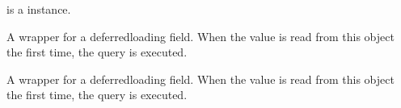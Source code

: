 \documentclass[letterpaper,10pt,spanish]{sphinxmanual}
\begin{document}
\begin{fulllineitems}
\begin{fulllineitems}
\sphinxAtStartPar
{} is a  instance.

\end{fulllineitems}



\begin{fulllineitems}

\pysigstartsignatures
{}
\pysigstopsignatures
\end{fulllineitems}



\begin{fulllineitems}

\pysigstartsignatures
{}
\pysigstopsignatures
\sphinxAtStartPar
A wrapper for a deferred\sphinxhyphen{}loading field. When the value is read from this
object the first time, the query is executed.

\end{fulllineitems}



\begin{fulllineitems}

\pysigstartsignatures
{}
\pysigstopsignatures
\end{fulllineitems}



\begin{fulllineitems}

\pysigstartsignatures
{}
\pysigstopsignatures
\end{fulllineitems}



\begin{fulllineitems}

\pysigstartsignatures
{}
\pysigstopsignatures
\sphinxAtStartPar
A wrapper for a deferred\sphinxhyphen{}loading field. When the value is read from this
object the first time, the query is executed.


\end{fulllineitems}
\end{fulllineitems}
\end{document}
